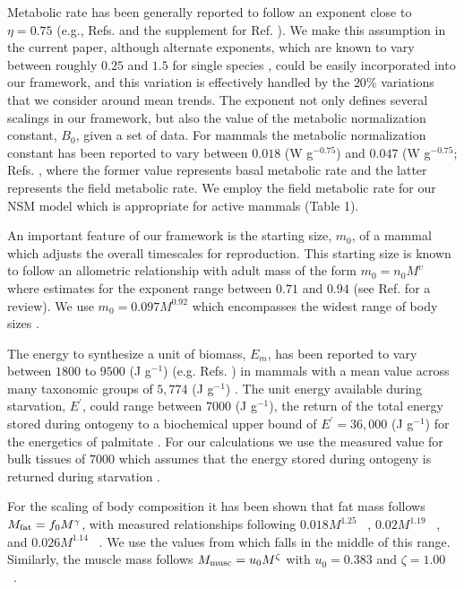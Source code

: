 \documentclass[twocolumn,preprintnumbers,amsmath,amssymb,superscriptaddress]{revtex4}
\begin{document}
Metabolic rate has been generally reported to follow an exponent close to $\eta=0.75$ (e.g., Refs. \citep{West:2001bv,moses2008rmo} and the supplement for Ref. \citep{hou}). We make this assumption in the current paper, although alternate exponents, which are known to vary between roughly $0.25$ and $1.5$ for single species \citep{moses2008rmo}, could be easily incorporated into our framework, and this variation is effectively handled by the $20\%$ variations that we consider around mean trends. The exponent not only defines several scalings in our framework, but also the value of the metabolic normalization constant, $B_{0}$, given a set of data.  For mammals the metabolic normalization constant has been reported to vary between $0.018$ (W g$^{-0.75}$) and $0.047$ (W g$^{-0.75}$; Refs. \citep{hou,West:2001bv}, where the former value represents basal metabolic rate and the latter represents the field metabolic rate. We employ the field metabolic rate for our NSM model which is appropriate for active mammals (Table 1).

An important feature of our framework is the starting size, $m_{0}$, of a mammal which adjusts the overall timescales for reproduction. This starting size is known to follow an allometric relationship with adult mass of the form $m_{0}=n_{0}M^{\upsilon}$ where estimates for the exponent range between $0.71$ and $0.94$ (see Ref. \citep{peters1986ecological} for a review). We use $m_{0}=0.097M^{0.92}$ \citep{blueweiss1978relationships} which encompasses the widest range of body sizes \citep{peters1986ecological}.

The energy to synthesize a unit of biomass, $E_{m}$, has been reported to vary between $1800$ to $9500$ (J g$^{-1}$) (e.g. Refs. \citep{West:2001bv,moses2008rmo,hou}) in mammals with a mean value across many taxonomic groups of $5,774$ (J g$^{-1}$) \citep{moses2008rmo}. The unit energy available during starvation, $E^{\prime}$, could range between $7000$ (J g$^{-1}$), the return of the total energy stored during ontogeny \citep{hou} to a biochemical upper bound of $E^{\prime}=36,000$ (J g$^{-1}$) for the energetics of palmitate \citep{stryer,hou}. For our calculations we use the measured value for bulk tissues of $7000$ which assumes that the energy stored during ontogeny is returned during starvation \citep{hou}.

For the scaling of body composition it has been shown that fat mass follows $M_{\rm fat}=f_{0}M^{\gamma}$, with measured  relationships following  $0.018M^{1.25}$ ~\citep{Dunbrack:1993ec}, $0.02M^{1.19}$ ~\citep{Lindstedt:1985hm}, and $0.026M^{1.14}$ ~\citep{Lindstedt:2002td}. We use the values from \citep{Lindstedt:1985hm} which falls in the middle of this range. Similarly, the muscle mass follows $M_{\rm musc}=u_{0}M^{\zeta}$ with $u_{0}=0.383$ and $\zeta=1.00$ ~\citep{Lindstedt:2002td}.
\end{document}
